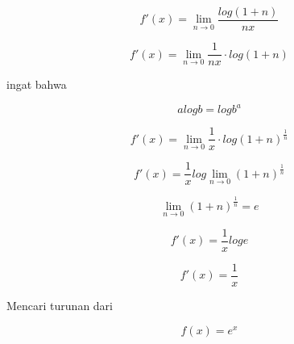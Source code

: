 \documentclass[a4paper,10pt]{article}
\begin{document}
\begin{eulernotebook}
\begin{eulercomment}
\begin{eulercomment}
\begin{eulercomment}
\begin{eulercomment}
\begin{eulercomment}
\begin{eulercomment}
\begin{eulercomment}
\begin{eulercomment}
\begin{eulercomment}
\begin{eulercomment}
\begin{eulercomment}
\begin{eulercomment}
\begin{eulercomment}
\begin{eulercomment}
\begin{eulercomment}
\begin{eulercomment}
\begin{eulercomment}
\begin{eulercomment}
\begin{eulercomment}
\begin{eulercomment}
\begin{eulercomment}
\end{eulercomment}
\begin{eulerformula}
\[
f'(x)=\lim_{n\to 0}\frac{ log (1 + n)}{nx}
\]
\end{eulerformula}
\begin{eulerformula}
\[
f'(x)=\lim_{n\to 0}\frac{1}{nx} \cdot log(1+n)
\]
\end{eulerformula}
\begin{eulercomment}
ingat bahwa\\
\end{eulercomment}
\begin{eulerformula}
\[
a log b = log b^a
\]
\end{eulerformula}
\begin{eulercomment}
\end{eulercomment}
\begin{eulerformula}
\[
f'(x)=\lim_{n\to 0} \frac{1}{x} \cdot log(1+n)^\frac{1}{n}
\]
\end{eulerformula}
\begin{eulerformula}
\[
f'(x)= \frac{1}{x}log \lim_{n\to 0}(1+n)^\frac{1}{n}
\]
\end{eulerformula}
\begin{eulercomment}
\end{eulercomment}
\begin{eulerformula}
\[
\lim_{n\to 0}(1+n)^\frac{1}{n} = e
\]
\end{eulerformula}
\begin{eulercomment}
\end{eulercomment}
\begin{eulerformula}
\[
f'(x)= \frac{1}{x}log e
\]
\end{eulerformula}
\begin{eulerformula}
\[
f'(x)=\frac{1}{x}
\]
\end{eulerformula}
\begin{eulercomment}
\end{eulercomment}
\begin{eulercomment}
Mencari turunan dari\\
\end{eulercomment}
\begin{eulerformula}
\[
f(x)=e^x
\]
\end{eulerformula}
\end{eulercomment}
\end{eulercomment}
\end{eulercomment}
\end{eulercomment}
\end{eulercomment}
\end{eulercomment}
\end{eulercomment}
\end{eulercomment}
\end{eulercomment}
\end{eulercomment}
\end{eulercomment}
\end{eulercomment}
\end{eulercomment}
\end{eulercomment}
\end{eulercomment}
\end{eulercomment}
\end{eulercomment}
\end{eulercomment}
\end{eulercomment}
\end{eulercomment}
\end{eulernotebook}
\end{document}
